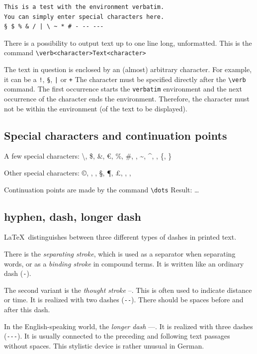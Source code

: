 \documentclass{llncs}
\begin{document}
\begin{verbatim}
This is a test with the environment verbatim.
You can simply enter special characters here.
§ $ % & / | \ ~ * # - -- ---
\end{verbatim}

There is a possibility to output text up to one line long, unformatted. This is the command \verb!\verb<character>Text<character>!

The text in question is enclosed by an (almost) arbitrary character. For example, it can be a \verb+!+, \verb!§!, \verb!|! or \verb!+! The character must be specified directly after the \verb!\verb! command. The first occurrence starts the \verb!verbatim! environment and the next occurrence of the character ends the environment. Therefore, the character must not be within the environment (of the text to be displayed).

\subsection{Special characters and continuation points}

A few special characters: \textbackslash, \$, \&, \euro, \%, \#, \textunderscore, \textasciitilde, \textasciicircum, \textbar, \{, \}

Other special characters: \copyright, \textregistered, \texttrademark, \S, \P, \pounds, \dag, \ddag, \textbullet

Continuation points are made by the command \verb!\dots! Result: \dots

\subsection{hyphen, dash, longer dash}

\LaTeX\ distinguishes between three different types of dashes in printed text.

There is the \emph{separating stroke}, which is used as a separator when separating words, or as a \emph{binding stroke} in compound terms. It is written like an ordinary dash (\verb!-!).

The second variant is the \emph{thought stroke} --. This is often used to indicate distance or time. It is realized with two dashes (\verb!--!). There should be spaces before and after this dash.

In the English-speaking world, the \emph{longer
  dash} ---. It is realized with three dashes (\verb!---!). It is usually connected to the preceding and following text passages without spaces. This stylistic device is rather unusual in German.
\end{document}
